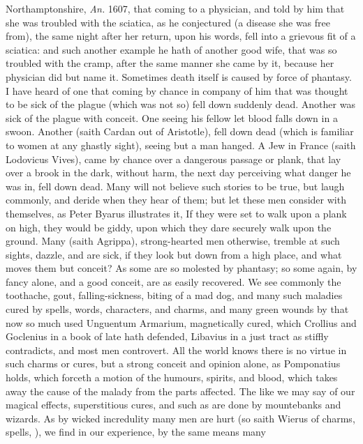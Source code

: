 {Northamptonshire, \emph{An.} 1607, that coming to a physician, and told by
him that she was troubled with the sciatica, as he conjectured (a
disease she was free from), the same night after her return, upon his
words, fell into a grievous fit of a sciatica: and such another example
he hath of another good wife, that was so troubled with the cramp,
after the same manner she came by it, because her physician did but
name it. Sometimes death itself is caused by force of phantasy. I have
heard of one that coming by chance in company of him that was thought
to be sick of the plague (which was not so) fell down suddenly dead.
Another was sick of the plague with conceit. One seeing his fellow let
blood falls down in a swoon. Another (saith Cardan out of
Aristotle), fell down dead (which is familiar to women at any ghastly
sight), seeing but a man hanged. A Jew in France (saith Lodovicus
Vives), came by chance over a dangerous passage or plank, that lay over
a brook in the dark, without harm, the next day perceiving what danger
he was in, fell down dead. Many will not believe such stories to be
true, but laugh commonly, and deride when they hear of them; but let
these men consider with themselves, as Peter Byarus illustrates
it, If they were set to walk upon a plank on high, they would be giddy,
upon which they dare securely walk upon the ground. Many (saith
Agrippa), strong-hearted men otherwise, tremble at such sights,
dazzle, and are sick, if they look but down from a high place, and what
moves them but conceit? As some are so molested by phantasy; so some
again, by fancy alone, and a good conceit, are as easily recovered. We
see commonly the toothache, gout, falling-sickness, biting of a mad
dog, and many such maladies cured by spells, words, characters, and
charms, and many green wounds by that now so much used Unguentum
Armarium, magnetically cured, which Crollius and Goclenius in a book of
late hath defended, Libavius in a just tract as stiffly contradicts,
and most men controvert. All the world knows there is no virtue in such
charms or cures, but a strong conceit and opinion alone, as
Pomponatius holds, which forceth a motion of the humours,
spirits, and blood, which takes away the cause of the malady from the
parts affected. The like we may say of our magical effects,
superstitious cures, and such as are done by mountebanks and wizards.
As by wicked incredulity many men are hurt (so saith Wierus of
charms, spells, \etc{}), we find in our experience, by the same means many
}
